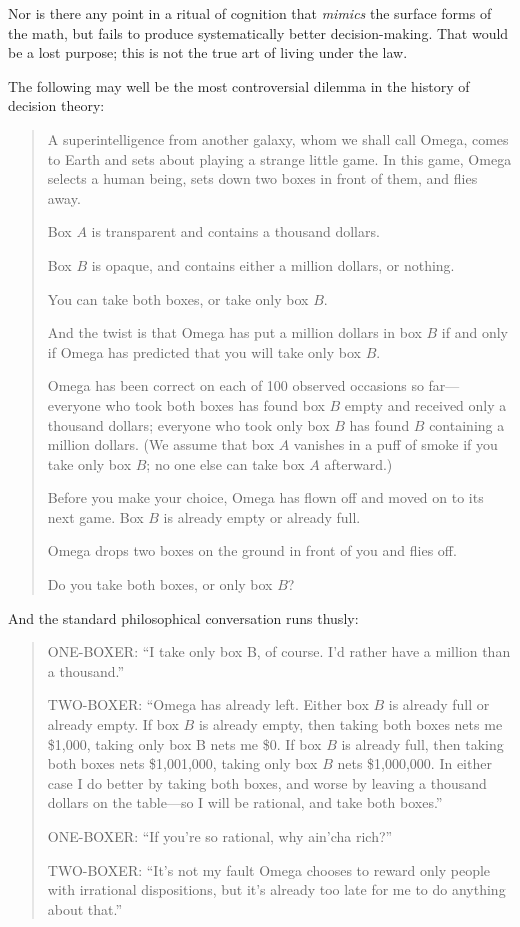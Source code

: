 {
 Nor is there any point in a ritual of cognition that
\textit{mimics} the surface forms of the math, but fails to produce
systematically better decision-making. That would be a lost purpose;
this is not the true art of living under the law.}

\myendsectiontext


{
 The following may well be the most controversial dilemma in the
history of decision theory:}

\begin{quotation}
{
 A superintelligence from another galaxy, whom we shall call Omega,
comes to Earth and sets about playing a strange little game. In this
game, Omega selects a human being, sets down two boxes in front of
them, and flies away.}

{
 Box $A$ is transparent and contains a thousand dollars.}

{
 Box $B$ is opaque, and contains either a million dollars, or
nothing.}

{
 You can take both boxes, or take only box $B$.}

{
 And the twist is that Omega has put a million dollars in box $B$ if
and only if Omega has predicted that you will take only box $B$.}

{
 Omega has been correct on each of 100 observed occasions so
far---everyone who took both boxes has found box $B$ empty and received
only a thousand dollars; everyone who took only box $B$ has found $B$
containing a million dollars. (We assume that box $A$ vanishes in a puff
of smoke if you take only box $B$; no one else can take box $A$
afterward.)}

{
 Before you make your choice, Omega has flown off and moved on to
its next game. Box $B$ is already empty or already full.}

{
 Omega drops two boxes on the ground in front of you and flies
off.}

{
  Do you take both boxes, or only box $B$?}
\end{quotation}

{
 And the standard philosophical conversation runs thusly:}

\begin{quotation}
{
 ONE-BOXER: ``I take only box B, of course.
I'd rather have a million than a
thousand.''}

{
 TWO-BOXER: ``Omega has already left. Either box $B$
is already full or already empty. If box $B$ is already empty, then
taking both boxes nets me \$1,000, taking only box B nets me \$0. If
box $B$ is already full, then taking both boxes nets \$1,001,000, taking
only box $B$ nets \$1,000,000. In either case I do better by taking both
boxes, and worse by leaving a thousand dollars on the table---so I will
be rational, and take both boxes.''}

{
 ONE-BOXER: ``If you're so
rational, why ain'cha rich?''}

{
 TWO-BOXER: ``It's not my fault
Omega chooses to reward only people with irrational dispositions, but
it's already too late for me to do anything about
that.''}
\end{quotation}

